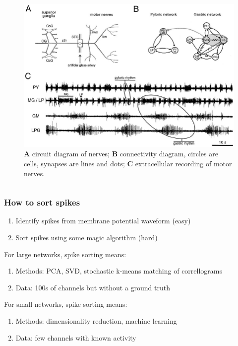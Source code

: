 \documentclass{beamer}
\begin{document}
\begin{frame}
\begin{columns}
    \begin{figure}
      \includegraphics[width=\textwidth]{gfx/STG-rhythms.png}
      \centering
      \caption{\textbf{A} circuit diagram of nerves; \textbf{B} connectivity diagram, circles are cells, synapses are lines and dots; \textbf{C} extracellular recording of motor nerves.}
      \label{fig:extracellular}
    \end{figure}

  \end{columns}

\end{frame}


\begin{frame}
  \frametitle{How to sort spikes}

  \begin{enumerate}
    \item Identify spikes from membrane potential waveform (easy)
    \item Sort spikes using some magic algorithm (hard)
  \end{enumerate}

  \medskip

  For large networks, spike sorting means:

  \begin{enumerate}
    \item Methods: PCA, SVD, stochastic k-means matching of correllograms
    \item Data: 100s of channels but without a ground truth
  \end{enumerate}

  \medskip

  For small networks, spike sorting means:

  \begin{enumerate}
    \item Methods: dimensionality reduction, machine learning
    \item Data: few channels with known activity
  \end{enumerate}

\end{frame}
\end{document}
